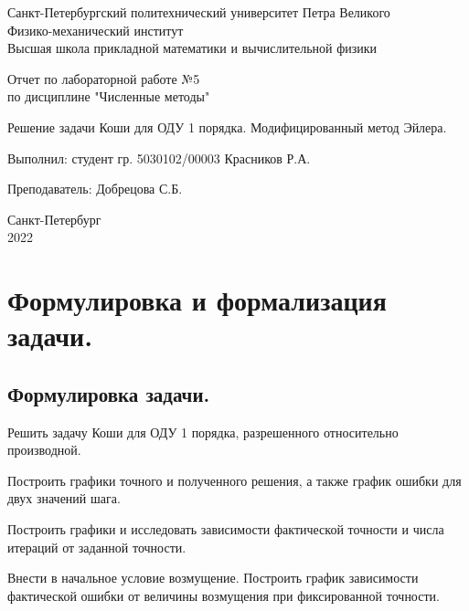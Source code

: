 \documentclass[a4paper, 12pt]{article}
\begin{document}
	\begin{titlepage}
		\begin{center}
			Санкт-Петербургский политехнический университет Петра Великого \\ Физико-механический институт \\ Высшая школа прикладной математики и вычислительной физики
		\end{center}
		\vspace{10em}
		\begin{center}
			\Large Отчет по лабораторной работе №5 \\ по дисциплине "Численные методы"
		\end{center}
		\vspace{1em}
		\begin{center}
			\Huge Решение задачи Коши для ОДУ 1 порядка. Модифицированный метод Эйлера.
		\end{center}
		\vspace{15em}
		{\Large 
			
			Выполнил: студент гр. 5030102/00003 Красников Р.А.
			\vspace{1em}
			
			Преподаватель: Добрецова С.Б.}
		\vspace{\fill}
		\begin{center}
			Санкт-Петербург \\ 2022
		\end{center}
	\end{titlepage}
	\newpage
	
	\section{Формулировка и формализация задачи.}
	
	\subsection{Формулировка задачи.}
	
	Решить задачу Коши для ОДУ 1 порядка, разрешенного относительно производной.
	
	Построить графики точного и полученного решения, а также график ошибки для двух значений шага.
	
	Построить графики и исследовать зависимости фактической точности и числа итераций от заданной точности.
	
	Внести в начальное условие возмущение. Построить график зависимости фактической ошибки от величины возмущения при фиксированной точности.  
	
\end{document}
